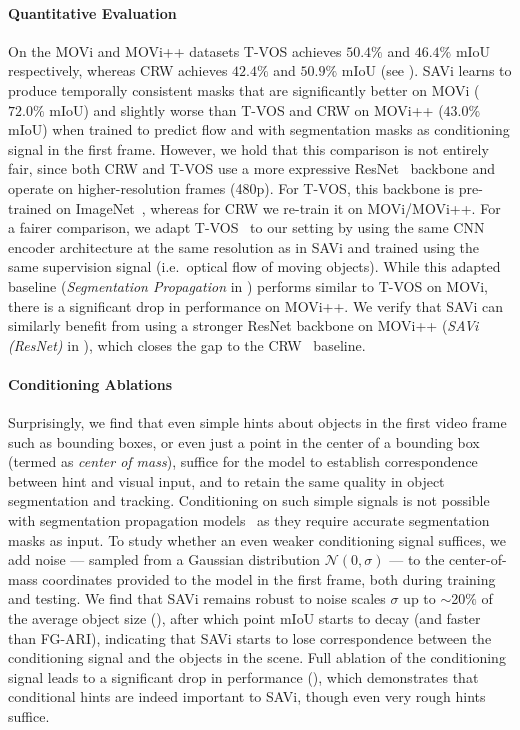\documentclass{article}
\newcommand{\modelname}{SAVi\xspace}
\begin{document}
\paragraph{Quantitative Evaluation}
On the MOVi and MOVi++ datasets T-VOS achieves $50.4\%$ and $46.4\%$ mIoU respectively, whereas CRW achieves $42.4\%$ and $50.9\%$ mIoU (see ).
\modelname learns to produce temporally consistent masks that are significantly better on MOVi ($72.0\%$ mIoU) and slightly worse than T-VOS and CRW on MOVi++ ($43.0\%$ mIoU) when trained to predict flow and with segmentation masks as conditioning signal in the first frame.
However, we hold that this comparison is not entirely fair, since both CRW and T-VOS use a more expressive ResNet~\citep{he2016deep} backbone and operate on higher-resolution frames (480p). For T-VOS, this backbone is pre-trained on ImageNet~\citep{deng2009imagenet}, whereas for CRW we re-train it on MOVi/MOVi++.
For a fairer comparison, we adapt T-VOS~\citep{zhang2020transductive} to our setting by using the same CNN encoder architecture at the same resolution as in SAVi and trained using the same supervision signal (i.e.~optical flow of moving objects). 
While this adapted baseline (\textit{Segmentation Propagation} in ) performs similar to T-VOS on MOVi, there is a significant drop in performance on MOVi++. We verify that SAVi can similarly benefit from using a stronger ResNet backbone on MOVi++ (\textit{SAVi (ResNet)} in ), which closes the gap to the CRW~\citep{jabri2020space} baseline.

\paragraph{Conditioning Ablations}
Surprisingly, we find that even simple hints about objects in the first video frame such as bounding boxes, or even just a point in the center of a bounding box (termed as \textit{center of mass}), suffice for the model to establish correspondence between hint and visual input, and to retain the same quality in object segmentation and tracking.
Conditioning on such simple signals is not possible with segmentation propagation models~\citep{zhang2020transductive,jabri2020space} as they require accurate segmentation masks as input.
To study whether an even weaker conditioning signal suffices, we add noise --- sampled from a Gaussian distribution $\mathcal{N}(0, \sigma)$ --- to the center-of-mass coordinates provided to the model in the first frame, both during training and testing.
We find that \modelname remains robust to noise scales $\sigma$ up to $\sim$20$\%$ of the average object size (), after which point mIoU starts to decay (and faster than FG-ARI), indicating that \modelname starts to lose correspondence between the conditioning signal and the objects in the scene. 
Full ablation of the conditioning signal leads to a significant drop in performance (), which demonstrates that conditional hints are indeed important to SAVi, though even very rough hints suffice.
\end{document}
